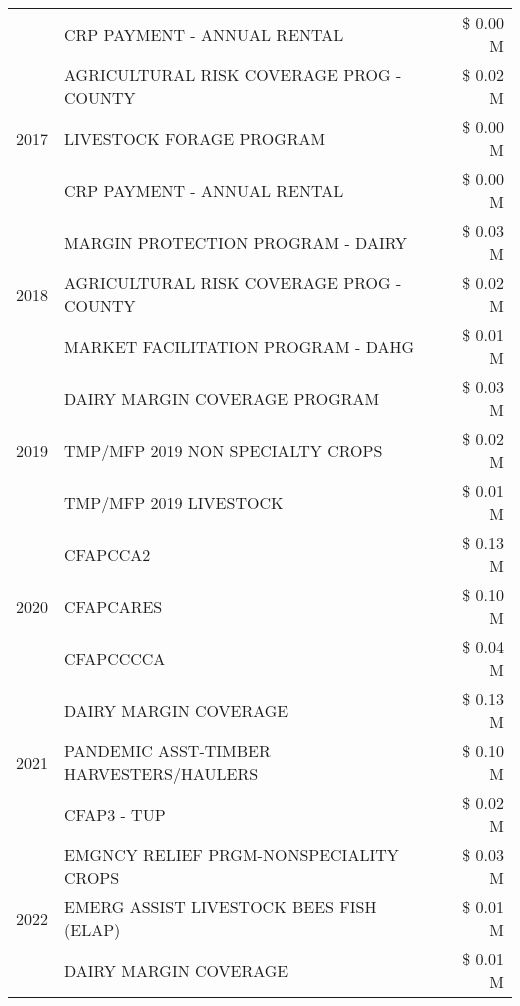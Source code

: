 \begin{tabular}{llr}
 & CRP PAYMENT - ANNUAL RENTAL & \$ 0.00 M \\
\cline{1-3}
\multirow[t]{3}{*}{2017} & AGRICULTURAL RISK COVERAGE PROG - COUNTY & \$ 0.02 M \\
 & LIVESTOCK FORAGE PROGRAM & \$ 0.00 M \\
 & CRP PAYMENT - ANNUAL RENTAL & \$ 0.00 M \\
\cline{1-3}
\multirow[t]{3}{*}{2018} & MARGIN PROTECTION PROGRAM - DAIRY & \$ 0.03 M \\
 & AGRICULTURAL RISK COVERAGE PROG - COUNTY & \$ 0.02 M \\
 & MARKET FACILITATION PROGRAM - DAHG & \$ 0.01 M \\
\cline{1-3}
\multirow[t]{3}{*}{2019} & DAIRY MARGIN COVERAGE PROGRAM & \$ 0.03 M \\
 & TMP/MFP 2019 NON SPECIALTY CROPS & \$ 0.02 M \\
 & TMP/MFP 2019 LIVESTOCK & \$ 0.01 M \\
\cline{1-3}
\multirow[t]{3}{*}{2020} & CFAPCCA2 & \$ 0.13 M \\
 & CFAPCARES & \$ 0.10 M \\
 & CFAPCCCCA & \$ 0.04 M \\
\cline{1-3}
\multirow[t]{3}{*}{2021} & DAIRY MARGIN COVERAGE & \$ 0.13 M \\
 & PANDEMIC ASST-TIMBER HARVESTERS/HAULERS & \$ 0.10 M \\
 & CFAP3 - TUP & \$ 0.02 M \\
\cline{1-3}
\multirow[t]{3}{*}{2022} & EMGNCY RELIEF PRGM-NONSPECIALITY CROPS & \$ 0.03 M \\
 & EMERG ASSIST LIVESTOCK BEES FISH (ELAP) & \$ 0.01 M \\
 & DAIRY MARGIN COVERAGE & \$ 0.01 M \\
\cline{1-3}
\bottomrule
\end{tabular}
